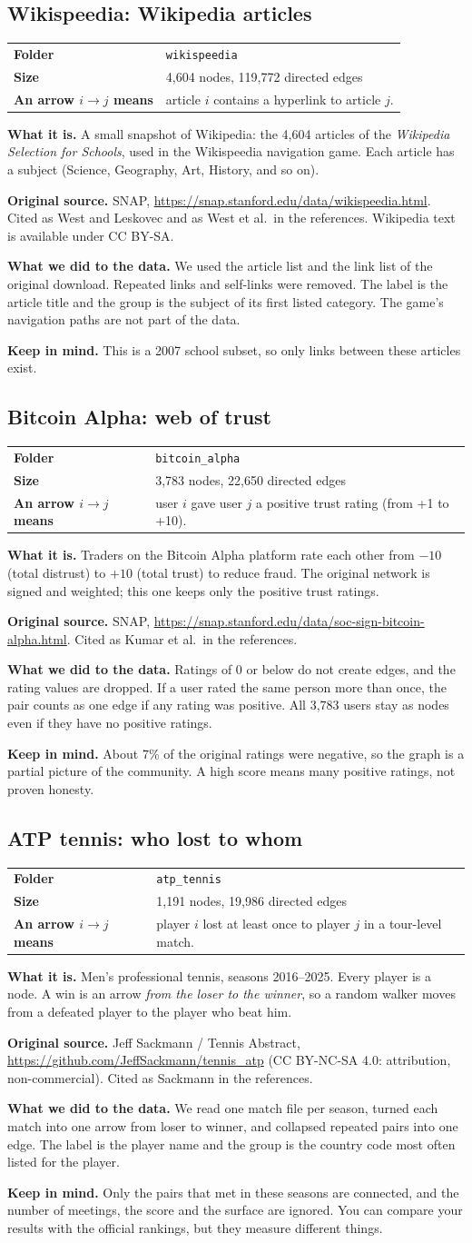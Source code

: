 \documentclass[11pt,a4paper]{article}
\makeatletter
\newcommand{\code}[1]{\texttt{#1}}
\newcommand{\dataset}[9]{%
  \subsection{#1}
  \begin{tabularx}{\textwidth}{@{}>{\bfseries}l X@{}}
    Folder & \code{#2}\\
    Size & #3 nodes, #4 directed edges\\
    An arrow $i\to j$ means & #5\\
  \end{tabularx}

  \textbf{What it is.} #6

  \textbf{Original source.} #7

  \textbf{What we did to the data.} #8

  \textbf{Keep in mind.} #9
}
\makeatother
\begin{document}
\dataset{Wikispeedia: Wikipedia articles}{wikispeedia}{4,604}{119,772}
{article $i$ contains a hyperlink to article $j$.}
{A small snapshot of Wikipedia: the 4,604 articles of the \emph{Wikipedia Selection for Schools}, used in the Wikispeedia navigation game. Each article has a subject (Science, Geography, Art, History, and so on).}
{SNAP, \url{https://snap.stanford.edu/data/wikispeedia.html}. Cited as West and Leskovec and as West et al.\ in the references. Wikipedia text is available under CC BY-SA.}
{We used the article list and the link list of the original download. Repeated links and self-links were removed. The label is the article title and the group is the subject of its first listed category. The game's navigation paths are not part of the data.}
{This is a 2007 school subset, so only links between these articles exist.}

\dataset{Bitcoin Alpha: web of trust}{bitcoin\_alpha}{3,783}{22,650}
{user $i$ gave user $j$ a positive trust rating (from +1 to +10).}
{Traders on the Bitcoin Alpha platform rate each other from $-10$ (total distrust) to $+10$ (total trust) to reduce fraud. The original network is signed and weighted; this one keeps only the positive trust ratings.}
{SNAP, \url{https://snap.stanford.edu/data/soc-sign-bitcoin-alpha.html}. Cited as Kumar et al.\ in the references.}
{Ratings of 0 or below do not create edges, and the rating values are dropped. If a user rated the same person more than once, the pair counts as one edge if any rating was positive. All 3,783 users stay as nodes even if they have no positive ratings.}
{About 7\% of the original ratings were negative, so the graph is a partial picture of the community. A high score means many positive ratings, not proven honesty.}

\dataset{ATP tennis: who lost to whom}{atp\_tennis}{1,191}{19,986}
{player $i$ lost at least once to player $j$ in a tour-level match.}
{Men's professional tennis, seasons 2016--2025. Every player is a node. A win is an arrow \emph{from the loser to the winner}, so a random walker moves from a defeated player to the player who beat him.}
{Jeff Sackmann / Tennis Abstract, \url{https://github.com/JeffSackmann/tennis_atp} (CC BY-NC-SA 4.0: attribution, non-commercial). Cited as Sackmann in the references.}
{We read one match file per season, turned each match into one arrow from loser to winner, and collapsed repeated pairs into one edge. The label is the player name and the group is the country code most often listed for the player.}
{Only the pairs that met in these seasons are connected, and the number of meetings, the score and the surface are ignored. You can compare your results with the official rankings, but they measure different things.}
\end{document}
